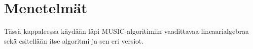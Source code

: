 \section{Menetelmät}
Tässä kappaleessa käydään läpi MUSIC-algoritimiin vaadittavaa lineaarialgebraa sekä esitellään itse algoritmi ja sen eri versiot.



\clearpage


\clearpage


\clearpage


\clearpage
